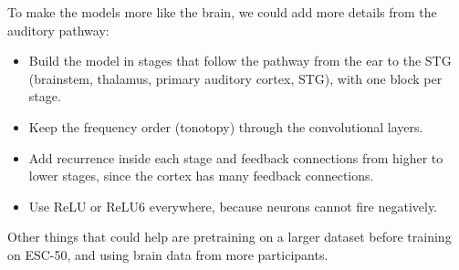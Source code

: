 \documentclass[11pt,a4paper]{article}
\begin{document}
To make the models more like the brain, we could add more details from the auditory pathway:
\begin{itemize}
  \item Build the model in stages that follow the pathway from the ear to the STG (brainstem, thalamus,
  primary auditory cortex, STG), with one block per stage.
  \item Keep the frequency order (tonotopy) through the convolutional layers.
  \item Add recurrence inside each stage and feedback connections from higher to lower stages, since the
  cortex has many feedback connections.
  \item Use ReLU or ReLU6 everywhere, because neurons cannot fire negatively.
\end{itemize}
Other things that could help are pretraining on a larger dataset before training on ESC-50, and using brain
data from more participants.
\end{document}

